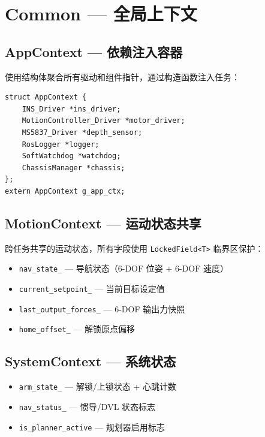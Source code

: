 \documentclass[12pt,a4paper]{article}
\begin{document}
\section{Common — 全局上下文}

\subsection{AppContext — 依赖注入容器}

使用结构体聚合所有驱动和组件指针，通过构造函数注入任务：

\begin{lstlisting}[caption={AppContext 定义}]
struct AppContext {
    INS_Driver *ins_driver;
    MotionController_Driver *motor_driver;
    MS5837_Driver *depth_sensor;
    RosLogger *logger;
    SoftWatchdog *watchdog;
    ChassisManager *chassis;
};
extern AppContext g_app_ctx;
\end{lstlisting}

\subsection{MotionContext — 运动状态共享}

跨任务共享的运动状态，所有字段使用 \texttt{LockedField<T>} 临界区保护：
\begin{itemize}
    \item \texttt{nav\_state\_} — 导航状态（6-DOF 位姿 + 6-DOF 速度）
    \item \texttt{current\_setpoint\_} — 当前目标设定值
    \item \texttt{last\_output\_forces\_} — 6-DOF 输出力快照
    \item \texttt{home\_offset\_} — 解锁原点偏移
\end{itemize}

\subsection{SystemContext — 系统状态}

\begin{itemize}
    \item \texttt{arm\_state\_} — 解锁/上锁状态 + 心跳计数
    \item \texttt{nav\_status\_} — 惯导/DVL 状态标志
    \item \texttt{is\_planner\_active} — 规划器启用标志
\end{itemize}
\end{document}
